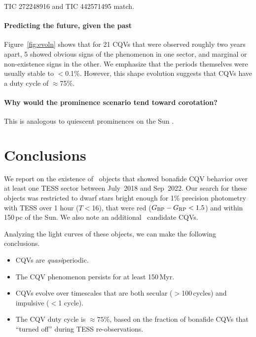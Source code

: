 \documentclass[11pt,twocolumn,tighten]{aastex63}
\newcommand{\bprp}{G_{\rm BP} - G_{\rm RP}}
\begin{document}
TIC 272248916 and TIC 442571495 match.



\paragraph{Predicting the future, given the past}
Figure~\ref{fig:evoln}
shows that for 21 CQVs that were observed roughly two years
apart, 5 showed obvious signs of the phenomenon in one sector,
and marginal or non-existence signs in the other.
We emphasize that the periods themselves were usually stable to $<$0.1\%.
However, this shape evolution
suggests that CQVs have a duty cycle of $\approx$75\%.



\paragraph{Why would the prominence scenario tend toward corotation?}
This is analogous to quiescent
prominences on the Sun \citep{1967SoPh....2...39K}.



\section{Conclusions}
\label{sec:conclusion}

We report on the existence of \ngoods\ objects that showed bonafide
CQV behavior over at least one TESS sector between July~2018 and Sep~2022.
Our search for these objects was restricted to dwarf stars bright enough
for 1\% precision photometry with TESS over 1 hour ($T$$<$16),
that were red ($\bprp<1.5$) and within 150\,pc of the Sun.
We also note an additional \nmaybes\ candidate CQVs.

Analyzing the light curves of these objects, we can make the following conclusions.

\begin{itemize}
	\item CQVs are {\it quasi}periodic.
	\item The CQV phenomenon persists for at least 150\,Myr.
	\item CQVs evolve over timescales that are both secular ($>$100\,cycles) and impulsive ($<$1 cycle).
	\item The CQV duty cycle is $\approx 75$\%, based on 
	the fraction of bonafide CQVs that ``turned off'' during TESS re-observations.
\end{itemize}
\end{document}
